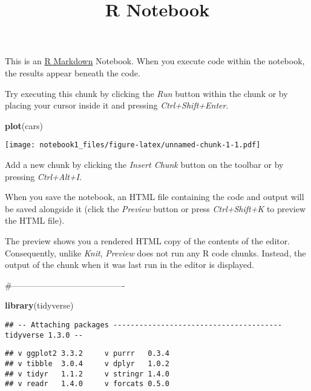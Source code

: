 \documentclass[
]{article}
\title{R Notebook}
\author{}
\date{\vspace{-2.5em}}
\newenvironment{Shaded}{\begin{snugshade}}{\end{snugshade}}
\newcommand{\KeywordTok}[1]{\textcolor[rgb]{0.13,0.29,0.53}{\textbf{#1}}}
\newcommand{\NormalTok}[1]{#1}
\begin{document}
\maketitle

This is an \href{http://rmarkdown.rstudio.com}{R Markdown} Notebook.
When you execute code within the notebook, the results appear beneath
the code.

Try executing this chunk by clicking the \emph{Run} button within the
chunk or by placing your cursor inside it and pressing
\emph{Ctrl+Shift+Enter}.

\begin{Shaded}
\begin{Highlighting}[]
\KeywordTok{plot}\NormalTok{(cars)}
\end{Highlighting}
\end{Shaded}

\texttt{[image: notebook1\_files/figure-latex/unnamed-chunk-1-1.pdf]}

Add a new chunk by clicking the \emph{Insert Chunk} button on the
toolbar or by pressing \emph{Ctrl+Alt+I}.

When you save the notebook, an HTML file containing the code and output
will be saved alongside it (click the \emph{Preview} button or press
\emph{Ctrl+Shift+K} to preview the HTML file).

The preview shows you a rendered HTML copy of the contents of the
editor. Consequently, unlike \emph{Knit}, \emph{Preview} does not run
any R code chunks. Instead, the output of the chunk when it was last run
in the editor is displayed.

\#----------------------------------------

\begin{Shaded}
\begin{Highlighting}[]
\KeywordTok{library}\NormalTok{(tidyverse)}
\end{Highlighting}
\end{Shaded}

\begin{verbatim}
## -- Attaching packages --------------------------------------- tidyverse 1.3.0 --
\end{verbatim}

\begin{verbatim}
## v ggplot2 3.3.2     v purrr   0.3.4
## v tibble  3.0.4     v dplyr   1.0.2
## v tidyr   1.1.2     v stringr 1.4.0
## v readr   1.4.0     v forcats 0.5.0
\end{verbatim}
\end{document}
